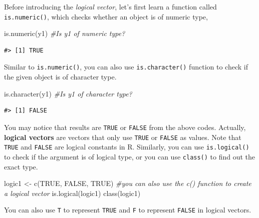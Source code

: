 \documentclass[
]{book}
\newenvironment{Shaded}{\begin{snugshade}}{\end{snugshade}}
\newcommand{\CommentTok}[1]{\textcolor[rgb]{0.56,0.35,0.01}{\textit{#1}}}
\newcommand{\ConstantTok}[1]{\textcolor[rgb]{0.00,0.00,0.00}{#1}}
\newcommand{\FunctionTok}[1]{\textcolor[rgb]{0.00,0.00,0.00}{#1}}
\newcommand{\NormalTok}[1]{#1}
\newcommand{\OtherTok}[1]{\textcolor[rgb]{0.56,0.35,0.01}{#1}}
\begin{document}
Before introducing the \emph{logical vector}, let's first learn a function called \texttt{is.numeric()}, which checks whether an object is of numeric type,

\begin{Shaded}
\begin{Highlighting}[]
\FunctionTok{is.numeric}\NormalTok{(y1) }\CommentTok{\#Is y1 of numeric type?}
\end{Highlighting}
\end{Shaded}

\begin{verbatim}
#> [1] TRUE
\end{verbatim}

Similar to \texttt{is.numeric()}, you can also use \texttt{is.character()} function to check if the given object is of character type.

\begin{Shaded}
\begin{Highlighting}[]
\FunctionTok{is.character}\NormalTok{(y1) }\CommentTok{\#Is y1 of character type?}
\end{Highlighting}
\end{Shaded}

\begin{verbatim}
#> [1] FALSE
\end{verbatim}

You may notice that results are \texttt{TRUE} or \texttt{FALSE} from the above codes. Actually, \textbf{logical vectors} are vectors that only use \texttt{TRUE} or \texttt{FALSE} as values. Note that \texttt{TRUE} and \texttt{FALSE} are logical constants in R. Similarly, you can use \texttt{is.logical()} to check if the argument is of logical type, or you can use \texttt{class()} to find out the exact type.

\begin{Shaded}
\begin{Highlighting}[]
\NormalTok{logic1 }\OtherTok{\textless{}{-}} \FunctionTok{c}\NormalTok{(}\ConstantTok{TRUE}\NormalTok{, }\ConstantTok{FALSE}\NormalTok{, }\ConstantTok{TRUE}\NormalTok{) }\CommentTok{\#you can also use the c() function to create a logical vector}
\FunctionTok{is.logical}\NormalTok{(logic1)}
\FunctionTok{class}\NormalTok{(logic1)}
\end{Highlighting}
\end{Shaded}

You can also use \texttt{T} to represent \texttt{TRUE} and \texttt{F} to represent \texttt{FALSE} in logical vectors.
\end{document}
